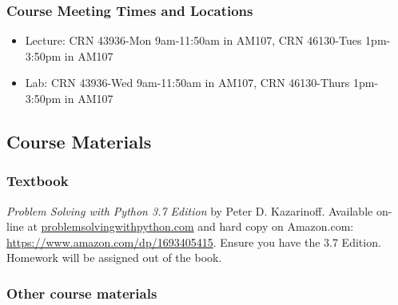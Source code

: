 \documentclass[11pt]{article}
\providecommand{\tightlist}{%
      \setlength{\itemsep}{0pt}\setlength{\parskip}{0pt}}
\begin{document}
\hypertarget{course-meeting-times-and-locations}{%
\subsubsection{Course Meeting Times and
Locations}\label{course-meeting-times-and-locations}}

\begin{itemize}
\tightlist
\item
  Lecture: CRN 43936-Mon 9am-11:50am in AM107, CRN 46130-Tues 1pm-3:50pm
  in AM107
\item
  Lab: CRN 43936-Wed 9am-11:50am in AM107, CRN 46130-Thurs 1pm-3:50pm in
  AM107
\end{itemize}

\hypertarget{course-materials}{%
\subsection{Course Materials}\label{course-materials}}

\hypertarget{textbook}{%
\subsubsection{Textbook}\label{textbook}}

\emph{Problem Solving with Python 3.7 Edition} by Peter D. Kazarinoff.
Available on-line at
\href{https://problemsolvingwithpython.com/}{problemsolvingwithpython.com}
and hard copy on Amazon.com: \url{https://www.amazon.com/dp/1693405415}.
Ensure you have the 3.7 Edition. Homework will be assigned out of the
book.

\hypertarget{other-course-materials}{%
\subsubsection{Other course materials}\label{other-course-materials}}
\end{document}
